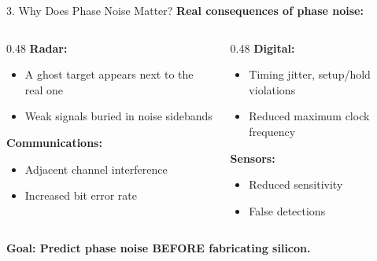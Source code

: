 \documentclass[aspectratio=169, 11pt]{beamer}
\begin{document}
\begin{frame}{3. Why Does Phase Noise Matter?}
    \textbf{Real consequences of phase noise:}

    \vspace{0.5em}
    \begin{columns}[T]
        \begin{column}{0.48\textwidth}
            \textbf{Radar:}
            \begin{itemize}
                \item A ghost target appears next to the real one
                \item Weak signals buried in noise sidebands
            \end{itemize}
            \vspace{0.3em}
            \textbf{Communications:}
            \begin{itemize}
                \item Adjacent channel interference
                \item Increased bit error rate
            \end{itemize}
        \end{column}
        \begin{column}{0.48\textwidth}
            \textbf{Digital:}
            \begin{itemize}
                \item Timing jitter, setup/hold violations
                \item Reduced maximum clock frequency
            \end{itemize}
            \vspace{0.3em}
            \textbf{Sensors:}
            \begin{itemize}
                \item Reduced sensitivity
                \item False detections
            \end{itemize}
        \end{column}
    \end{columns}

    \vspace{0.5em}
    \textcolor{myred}{\textbf{Goal: Predict phase noise BEFORE fabricating silicon.}}
\end{frame}
\end{document}
